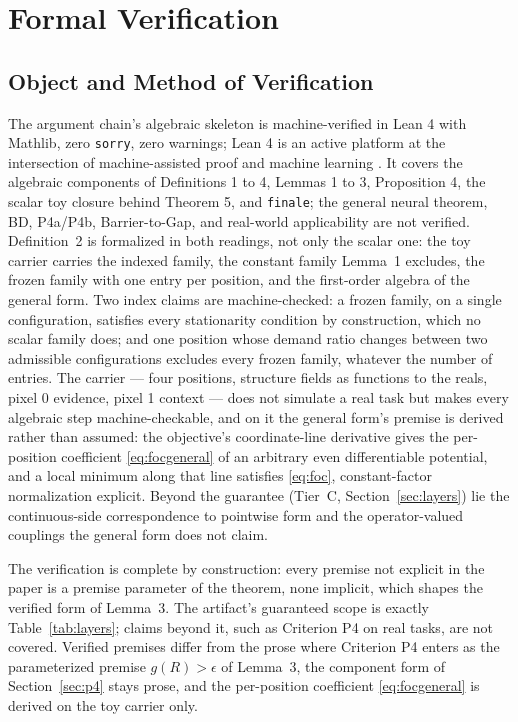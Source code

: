 \section{Formal Verification}
\label{ch:verify}

\subsection{Object and Method of Verification}

The argument chain's algebraic skeleton is machine-verified in Lean 4 with Mathlib, zero \texttt{sorry}, zero warnings; Lean 4 is an active platform at the intersection of machine-assisted proof and machine learning \citep{yang2023}. It covers the algebraic components of Definitions 1 to 4, Lemmas 1 to 3, Proposition 4, the scalar toy closure behind Theorem 5, and \texttt{finale}; the general neural theorem, BD, P4a/P4b, Barrier-to-Gap, and real-world applicability are not verified. Definition~2 is formalized in both readings, not only the scalar one: the toy carrier carries the indexed family, the constant family Lemma~1 excludes, the frozen family with one entry per position, and the first-order algebra of the general form. Two index claims are machine-checked: a frozen family, on a single configuration, satisfies every stationarity condition by construction, which no scalar family does; and one position whose demand ratio changes between two admissible configurations excludes every frozen family, whatever the number of entries. The carrier --- four positions, structure fields as functions to the reals, pixel 0 evidence, pixel 1 context --- does not simulate a real task but makes every algebraic step machine-checkable, and on it the general form's premise is derived rather than assumed: the objective's coordinate-line derivative gives the per-position coefficient \eqref{eq:focgeneral} of an arbitrary even differentiable potential, and a local minimum along that line satisfies \eqref{eq:foc}, constant-factor normalization explicit. Beyond the guarantee (Tier~C, Section~\ref{sec:layers}) lie the continuous-side correspondence to pointwise form and the operator-valued couplings the general form does not claim.

The verification is complete by construction: every premise not explicit in the paper is a premise parameter of the theorem, none implicit, which shapes the verified form of Lemma~3. The artifact's guaranteed scope is exactly Table~\ref{tab:layers}; claims beyond it, such as Criterion P4 on real tasks, are not covered. Verified premises differ from the prose where Criterion P4 enters as the parameterized premise $g(R) > \epsilon$ of Lemma~3, the component form of Section~\ref{sec:p4} stays prose, and the per-position coefficient \eqref{eq:focgeneral} is derived on the toy carrier only.

